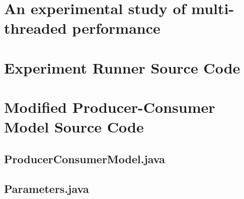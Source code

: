 \documentclass[12pt,a4paper]{article}
\begin{document}
  \section{An experimental study of multi-threaded performance}

  \appendix
  
		\section{Experiment Runner Source Code}

			

		\section{Modified Producer-Consumer Model Source Code}
			
			\subsection{ProducerConsumerModel.java}

				

			\subsection{Parameters.java}

				
\end{document}
